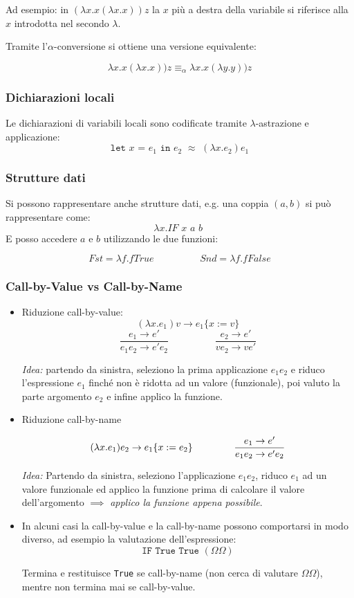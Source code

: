 \documentclass[a4paper,10pt]{article}
\begin{document}
 Ad esempio: in  $ (\lambda x.x (\lambda x.x))z$ la $x$ più a destra della variabile si riferisce alla $x$ introdotta nel secondo $\lambda$.
 
 Tramite l'$\alpha$-conversione si ottiene una versione equivalente:
 
 \[ \lambda x.x (\lambda x.x))z \equiv_\alpha \lambda x.x (\lambda y.y))z \]
 
 \subsubsection{Dichiarazioni locali}
 Le dichiarazioni di variabili locali sono codificate tramite $\lambda$-astrazione e applicazione:
 \[\texttt{let $x$ = $e_1$ in $e_2$} \,\,\approx \,\, (\lambda x.e_2) e_1\]
 
 \subsubsection{Strutture dati}
 Si possono rappresentare anche strutture dati, e.g. una coppia $(a, b)$ si può rappresentare come:
 \[ \lambda x. IF\,\, x\,\, a\,\, b\,\, \]
 E posso accedere $a$ e $b$ utilizzando le due funzioni:
 
 \[ Fst = \lambda f.f True \hspace{2cm} Snd = \lambda f.f False \]
 
 
 \subsubsection{Call-by-Value vs Call-by-Name}
\begin{itemize}
 \item Riduzione call-by-value:
 \[(\lambda x.e_1)v \to e_1\{x := v\}\]
 \[ \dfrac{e_1 \to e'}{e_1e_2 \to e'e_2} \hspace{2cm} \dfrac{e_2 \to e'}{ve_2 \to ve'} \]
 
 \textit{Idea:} partendo da sinistra, seleziono la prima applicazione $e_1e_2$ e riduco l'espressione $e_1$ finché non è ridotta ad un valore (funzionale), poi valuto la parte argomento $e_2$ e infine applico la funzione.
 
 \item Riduzione call-by-name
 
 \[(\lambda x.e_1 )e_2 \to e_1\{x:=e_2\} \hspace {1.5cm} \dfrac{e_1 \to e'}{e_1e_2 \to e'e_2}\] 
 
  \textit{Idea:} Partendo da sinistra, seleziono l'applicazione $e_1e_2$, riduco $e_1$ ad un valore funzionale ed applico la funzione prima di calcolare il valore dell'argomento $\implies$ \textit{applico la funzione appena possibile}.
 \item In alcuni casi la call-by-value e la call-by-name possono comportarsi in modo diverso, ad esempio la valutazione dell'espressione:
 \[\texttt{IF True True}\,\,(\Omega \Omega)\]
 
 Termina e restituisce \texttt{True} se call-by-name (non cerca di valutare $\Omega \Omega$), mentre non termina mai se call-by-value.
\end{itemize}
\newpage
\end{document}
